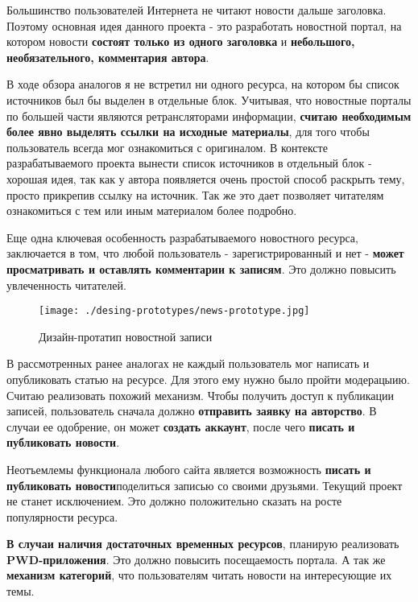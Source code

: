   Большинство пользователей Интернета не читают новости дальше заголовка. Поэтому основная идея данного проекта - это разработать новостной портал, на котором новости \textbf{состоят только из одного заголовка} и \textbf{небольшого, необязательного, комментария автора}.

  В ходе обзора аналогов я не встретил ни одного ресурса, на котором бы список источников был бы выделен в отдельные блок. Учитывая, что новостные порталы по большей части являются ретрансляторами информации, \textbf{считаю необходимым более явно выделять ссылки на исходные материалы}, для того чтобы пользователь всегда мог ознакомиться с оригиналом. В контексте разрабатываемого проекта вынести список источников в отдельный блок - хорошая идея, так как у автора появляется очень простой способ раскрыть тему, просто прикрепив ссылку на источник. Так же это дает позволяет читателям ознакомиться с тем или иным материалом более подробно.

  Еще одна ключевая особенность разрабатываемого новостного ресурса, заключается в том, что \textbf{}{любой} пользователь - зарегистрированный и нет - \textbf{может просматривать и оставлять комментарии к записям}. Это должно повысить увлеченность читателей.

  \begin{figure}[!ht]
    \centering
      \texttt{[image: ./desing-prototypes/news-prototype.jpg]}
      \caption{Дизайн-протатип новостной записи}
    \label{news-prototype}
  \end{figure}

  В рассмотренных ранее аналогах не каждый пользователь мог написать и опубликовать статью на ресурсе. Для этого ему нужно было пройти модерацыию. Считаю реализовать похожий механизм. Чтобы получить доступ к публикации записей, пользователь сначала должно \textbf{отправить заявку на авторство}. В случаи ее одобрение, он может \textbf{создать аккаунт}, после чего \textbf{писать и публиковать новости}.

  Неотъемлемы функционала любого сайта является возможность \textbf{писать и публиковать новости}{поделиться записью} со своими друзьями. Текущий проект не станет исключением. Это должно положительно сказать на росте популярности ресурса.

  \textbf{В случаи наличия достаточных временных ресурсов}, планирую реализовать \textbf{PWD-приложения}. Это должно повысить посещаемость портала. А так же \textbf{механизм категорий}, что пользователям читать новости на интересующие их темы.